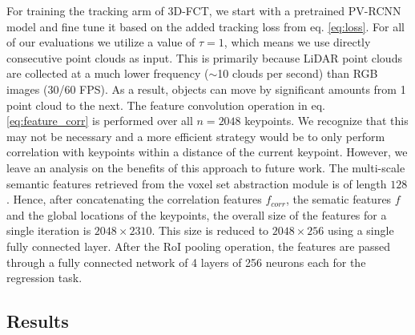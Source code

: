 \documentclass[10pt,twocolumn,letterpaper]{article}
\begin{document}
 For training the tracking arm of 3D-FCT, we start with a pretrained PV-RCNN model and fine tune it based on the added tracking loss from eq. \ref{eq:loss}. For all of our evaluations we utilize a value of $\tau = 1$, which means we use directly consecutive point clouds as input. This is primarily because LiDAR point clouds are collected at a much lower frequency ($\sim$10 clouds per second) than RGB images (30/60 FPS). As a result, objects can move by significant amounts from 1 point cloud to the next. The feature convolution operation in eq. \ref{eq:feature_corr} is performed over all $n=2048$ keypoints. We recognize that this may not be necessary and a more efficient strategy would be to only perform correlation with keypoints within a distance of the current keypoint. However, we leave an analysis on the benefits of this approach to future work. The multi-scale semantic features retrieved from the voxel set abstraction module is of length $128$. Hence, after concatenating the correlation features $f_{corr}$, the sematic features $f$ and the global locations of the keypoints, the overall size of the features for a single iteration is $2048\times 2310$. This size is reduced to $2048 \times 256$ using a single fully connected layer. After the RoI pooling operation, the features are passed through a fully connected network of 4 layers of 256 neurons each for the regression task.

\subsection{Results}
\begin{table}
   \centering
   \caption{Ablation study on effect of track regression and tracklet linking. PV-RCNN \cite{Shi_2020_CVPR} acts as the baseline.}
   \label{tab:ablation}
\end{table}
\end{document}
